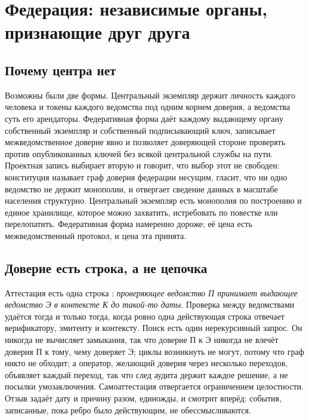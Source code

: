 \section{Федерация: независимые органы, признающие друг друга}
\label{sec:federation}



\subsection{Почему центра нет}

Возможны были две формы. Центральный экземпляр держит личность каждого человека и токены каждого
ведомства под одним корнем доверия, а ведомства суть его арендаторы. Федеративная форма даёт
каждому выдающему органу собственный экземпляр и собственный подписывающий ключ, записывает
межведомственное доверие явно и позволяет доверяющей стороне проверять против опубликованных
ключей без всякой центральной службы на пути. Проектная запись выбирает вторую и говорит, что выбор
этот не свободен: конституция называет граф доверия федерации несущим, гласит, что ни одно
ведомство не держит монополии, и отвергает сведение данных в масштабе населения структурно.
Центральный экземпляр есть монополия по построению и единое хранилище, которое можно захватить,
истребовать по повестке или перелопатить. Федеративная форма намеренно дороже; её цена есть
межведомственный протокол, и цена эта принята. \sImpl

\subsection{Доверие есть строка, а не цепочка}

Аттестация есть одна строка : \emph{проверяющее ведомство П
принимает выдающее ведомство Э в контексте К до такой-то даты}. Проверка между ведомствами удаётся
тогда и только тогда, когда ровно одна действующая строка отвечает верификатору, эмитенту и
контексту. Поиск есть один нерекурсивный запрос. Он никогда не вычисляет замыкания, так что доверие
П к Э никогда не влечёт доверия П к тому, чему доверяет Э; циклы возникнуть не могут, потому что
граф никто не обходит; а оператор, желающий доверия через несколько переходов, объявляет каждый
переход, так что след аудита держит каждое решение, а не посылки умозаключения. Самоаттестация
отвергается ограничением целостности. Отзыв задаёт дату и причину разом, единожды, и смотрит
вперёд: события, записанные, пока ребро было действующим, не обессмысливаются. \sImpl

